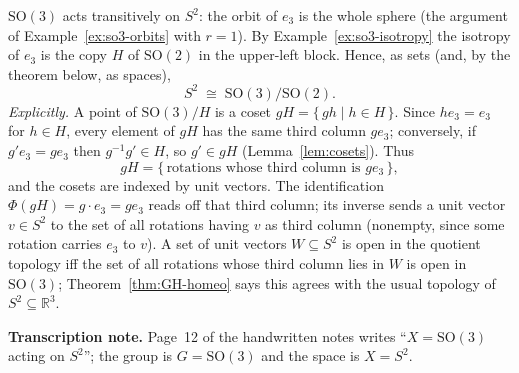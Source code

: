 \documentclass[11pt]{report}
\makeatletter
\newcounter{excounter}[section]
\newcommand{\exlabel}[1]{\edef\@currentlabel{\arabic{section}.\arabic{excounter}}\label{#1}}
\newcommand{\SO}{\mathrm{SO}}
\newcommand{\leeref}[1]{\par\smallskip{\raggedleft\footnotesize\textsc{Lee}:\ #1\par}}
\makeatother
\begin{document}
\begin{exbox}\exlabel{ex:s2-homogeneous}
$\SO(3)$ acts transitively on $S^2$: the orbit of $e_3$ is the whole sphere (the argument of Example~\ref{ex:so3-orbits} with $r = 1$). By Example~\ref{ex:so3-isotropy} the isotropy of $e_3$ is the copy $H$ of $\SO(2)$ in the upper-left block. Hence, as sets (and, by the theorem below, as spaces),
\[
S^2 \;\cong\; \SO(3)/\SO(2).
\]
\emph{Explicitly.} A point of $\SO(3)/H$ is a coset $gH = \{\, gh \mid h \in H \,\}$. Since $h e_3 = e_3$ for $h \in H$, every element of $gH$ has the same third column $g e_3$; conversely, if $g' e_3 = g e_3$ then $g^{-1} g' \in H$, so $g' \in gH$ (Lemma~\ref{lem:cosets}). Thus
\[
gH = \{\, \text{rotations whose third column is } g e_3 \,\},
\]
and the cosets are indexed by unit vectors. The identification $\Phi(gH) = g \cdot e_3 = g e_3$ reads off that third column; its inverse sends a unit vector $v \in S^2$ to the set of all rotations having $v$ as third column (nonempty, since some rotation carries $e_3$ to $v$). A set of unit vectors $W \subseteq S^2$ is open in the quotient topology iff the set of all rotations whose third column lies in $W$ is open in $\SO(3)$; Theorem~\ref{thm:GH-homeo} says this agrees with the usual topology of $S^2 \subseteq \mathbb{R}^3$.
\leeref{Examples 21.15(a) and 21.19(a)}
\end{exbox}

\textbf{Transcription note.} Page~12 of the handwritten notes writes ``$X = \SO(3)$ acting on $S^2$''; the group is $G = \SO(3)$ and the space is $X = S^2$.

\begin{center}
\end{center}
\end{document}
